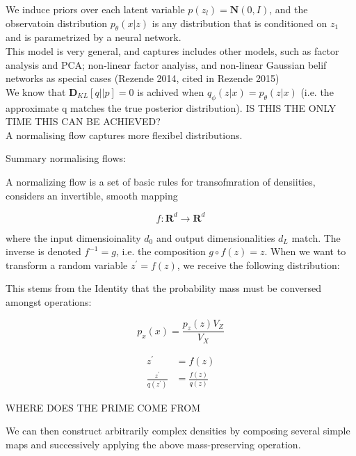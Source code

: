 \documentclass[a4paper,12pt,twoside,openright]{report}
\begin{document}
We induce priors over each latent variable $p(z_l) = \mathbf{N}(0, I)$, and the observatoin distribution $p_\theta(x|z)$ is any distribution that is conditioned on $z_1$ and is parametrized by a neural network. \\

This model is very general, and captures includes other models, such as factor analysis and PCA; non-linear factor analyiss, and non-linear Gaussian belif networks as special cases (Rezende 2014, cited in Rezende 2015) \\

We know that $\mathbf{D}_{KL}\left[ q || p\right] = 0$ is achived when $q_\phi(z|x) = p_\theta(z|x)$ (i.e. the approximate q matches the true posterior distribution). IS THIS THE ONLY TIME THIS CAN BE ACHIEVED? \\

A normalising flow captures more flexibel distributions.

Summary normalising flows:

A normalizing flow is a set of basic rules for transofmration of densiities, considers an invertible, smooth mapping

$$
f : \mathbf{R}^d \rightarrow \mathbf{R}^d
$$

where the input dimensioinality $d_0$ and output dimensionalities  $d_L$ match.
The inverse is denoted $f^{-1} = g$, i.e. the composition $g \circ f(z) = z$.
When we want to transform a random variable $z^\prime = f(z)$, we receive the following distribution:



This stems from the Identity that the probability mass must be conversed amongst operations:

\begin{equation}
p_x(x) = \frac{p_z(z) V_Z}{V_X}
\end{equation}

\begin{align}
	z^\prime &= f(z) \\
	\frac{z^\prime}{ q(z^\prime) } &= \frac{f(z)}{ q(z) }
\end{align}

WHERE DOES THE PRIME COME FROM

We can then construct arbitrarily complex densities by composing several simple maps and successively applying the above mass-preserving operation.
\end{document}
